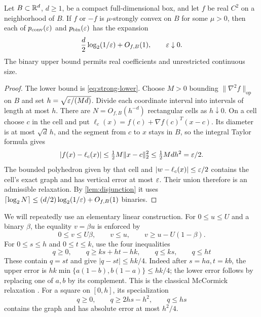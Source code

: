 \begin{corollary}\label{cor:c2-strong}
Let $B\subset\mathbb R^d$, $d\ge1$, be a compact full-dimensional box, and
let $f$ be real $C^2$ on a neighborhood of $B$. If $f$ or $-f$ is
$\mu$-strongly convex on $B$ for some $\mu>0$, then each of
$p_{\mathrm{conv}}(\varepsilon)$ and $p_{\mathrm{bin}}(\varepsilon)$ has the expansion
\[
 \frac d2\log_2(1/\varepsilon)+O_{f,B}(1),\qquad\varepsilon\downarrow0.
\]
The binary upper bound permits real coefficients and unrestricted
continuous size.
\end{corollary}
\begin{proof}
The lower bound is \eqref{eq:strong-lower}. Choose $M>0$ bounding
$\|\nabla^2f\|_{\mathrm{op}}$ on $B$ and set
$h=\sqrt{\varepsilon/(Md)}$. Divide each coordinate interval into intervals
of length at most $h$. There are $N=O_{f,B}(h^{-d})$ rectangular
cells as $h\downarrow0$. On a cell choose $c$ in the cell and put
$\ell_c(x)=f(c)+\nabla f(c)^T(x-c)$. Its diameter is at most
$\sqrt d\,h$, and the segment from $c$ to $x$ stays in $B$, so the
integral Taylor formula gives
\[
 |f(x)-\ell_c(x)|\le\tfrac12 M\|x-c\|_2^2
 \le\tfrac12 Md h^2=\varepsilon/2.
\]
The bounded polyhedron given by that cell and
$|w-\ell_c(x)|\le\varepsilon/2$ contains the cell's exact graph and has
vertical error at most $\varepsilon$. Their union therefore is an admissible
relaxation. By \cref{lem:disjunction} it uses
$\lceil\log_2N\rceil\le(d/2)\log_2(1/\varepsilon)+O_{f,B}(1)$ binaries.
\end{proof}

We will repeatedly use an elementary linear construction. For
$0\le u\le U$ and a binary $\beta$, the equality $v=\beta u$ is enforced by
\begin{equation}\label{eq:binary-product}
 0\le v\le U\beta,\qquad v\le u,\qquad
 v\ge u-U(1-\beta).
\end{equation}
For $0\le s\le h$ and $0\le t\le k$, use the four inequalities
\begin{equation}\label{eq:mccormick}
 q\ge0,\qquad q\ge ks+ht-hk,\qquad q\le ks,\qquad q\le ht
\end{equation}
These contain $q=st$ and give $|q-st|\le hk/4$.
Indeed after $s=ha,t=kb$, the upper error is
$hk\min\{a(1-b),b(1-a)\}\le hk/4$; the lower error follows by
replacing one of $a,b$ by its complement. This is the classical
McCormick relaxation \citep{mccormick1976}.
For a square on $[0,h]$, its specialization
\begin{equation}\label{eq:square-triangle}
 q\ge0,\qquad q\ge2hs-h^2,\qquad q\le hs
\end{equation}
contains the graph and has absolute error at most $h^2/4$.

